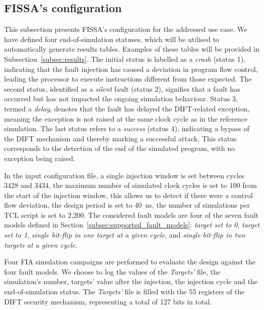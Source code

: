 \subsection{FISSA's configuration}
\label{subsec:tool_config}

This subsection presents FISSA's configuration for the addressed use case. We have defined four end-of-simulation statuses, which will be utilised to automatically generate results tables. Examples of these tables will be provided in Subsection~\ref{subsec:results}.
The initial status is labelled as a \textit{crash} (status 1), indicating that the fault injection has caused a deviation in program flow control, leading the processor to execute instructions different from those expected.
The second status, identified as a \textit{silent} fault (status 2), signifies that a fault has occurred but has not impacted the ongoing simulation behaviour.
Status 3, termed a \textit{delay}, denotes that the fault has delayed the DIFT-related exception, meaning the exception is not raised at the same clock cycle as in the reference simulation.
The last status refers to a \textit{success} (status 4), indicating a bypass of the DIFT mechanism and thereby marking a successful attack. This status corresponds to the detection of the end of the simulated program, with no exception being raised.

In the input configuration file, a single injection window is set between cycles 3428 and 3434, the maximum number of simulated clock cycles is set to 100 from the start of the injection window, this allows us to detect if there were a control flow deviation, the design period is set to 40~ns, the number of simulations per TCL script is set to 2,200. The considered fault models are four of the seven fault models defined in Section~\ref{subsec:supported_fault_models}: \textit{target set to 0}, \textit{target set to 1}, \textit{single bit-flip in one target at a given cycle}, and \textit{single bit-flip in two targets at a given cycle}.

Four FIA simulation campaigns are performed to evaluate the design against the four fault models.
We choose to log the values of the \textit{Targets'} file, the simulation's number, targets' value after the injection, the injection cycle and the end-of-simulation status.
The \textit{Targets'} file is filled with the 55 registers of the DIFT security mechanism, representing a total of 127 bits in total.

